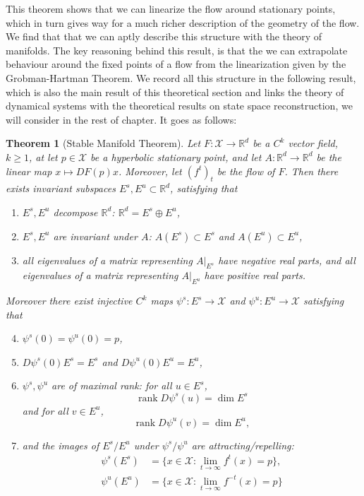 \documentclass[11pt, a4paper]{memoir}
\theoremstyle{break}
\newtheorem{thm}{Theorem}
\theoremstyle{break}
\theoremstyle{nonumberplain}
\newcommand{\mR}{\mathbb{R}}
\DeclareMathOperator{\rank}{rank}
\begin{document}
This theorem shows that we can linearize the flow around stationary points, which in turn gives way for a much richer description of the geometry of the flow. We find that that we can aptly describe this structure with the theory of manifolds. The key reasoning behind this result, is that the we can extrapolate behaviour around the fixed points of a flow from the linearization given by the Grobman-Hartman Theorem. We record all this structure in the following result, which is also the main result of this theoretical section and links the theory of dynamical systems with the theoretical results on state space reconstruction, we will consider in the rest of chapter. It goes as follows:
\begin{thm}[Stable Manifold Theorem]\label{stable}
Let $F:\mathcal{X}\to \mR^d$ be a $C^k$ vector field, $k\geqslant 1$, at let $p\in \mathcal{X}$ be a hyperbolic stationary point, and let $A:\mR^d\to\mR^d$ be the linear map $x\mapsto DF(p)x$. Moreover, let $(f^t)_t$ be the flow of $F$. Then there exists invariant subspaces $E^s,E^u\subset\mR^d$, satisfying that 
\begin{enumerate}[label=(\roman*)]
	\item $E^s,E^u$ decompose $\mR^d$: $\mR^d=E^s\oplus E^u$,
	\item $E^s,E^u$ are invariant under $A$: $A(E^s)\subset E^s$ and $A(E^u)\subset E^u$,
	\item all eigenvalues of a matrix representing $A|_{E^s}$ have negative real parts, and all eigenvalues of a matrix representing $A|_{E^u}$ have positive real parts.
\end{enumerate}
Moreover there exist injective $C^k$ maps $\psi^s: E^s\to \mathcal{X}$ and $\psi^u:E^u\to\mathcal{X}$ satisfying that
\begin{enumerate}[label=(\roman*)]
\setcounter{enumi}{3}
	\item $\psi^s(0)=\psi^u(0)=p$,
	\item $D\psi^s(0)E^s=E^s$ and  $D\psi^u(0)E^u=E^u$,
 \item $\psi^s,\psi^u$ are of maximal rank: for all $u\in E^s$, $$\rank D\psi^s(u)=\dim E^s$$ and for all $v\in E^u$, $$\rank D\psi^u(v)=\dim E^u,$$
 \item and the images of $E^s/E^u$ under $\psi^s/\psi^u$ are attracting/repelling:
 \begin{align*}
  \psi^s(E^s)&=\{x\in \mathcal{X}:\lim_{t\to\infty}f^t(x)=p\},\\
 \psi^u(E^u)&=\{x\in \mathcal{X}:\lim_{t\to\infty}f^{-t}(x)=p\}
 \end{align*}
\end{enumerate}
\end{thm}
\end{document}
